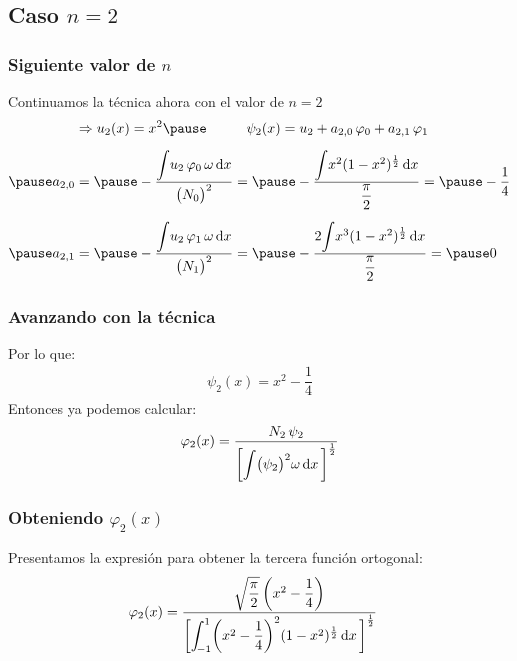 \documentclass[12pt]{beamer}
\begin{document}
\subsection{Caso \texorpdfstring{$n = 2$}{n = 2}}

\begin{frame}
\frametitle{Siguiente valor de $n$}
Continuamos la técnica ahora con el valor de $n = 2$
\pause
\begin{eqnarray*}
\begin{aligned}
&\Rightarrow u_{2} (x) = x^{2} \pause \hspace{1cm} \psi_{2}(x) =  u_{2} + a_{2,0} \, \varphi_{0} + a_{2,1} \, \varphi_{1} \\[0.5em] \pause
a_{2,0} &= \pause - \dfrac{\scaleint{5ex} u_{2} \, \varphi_{0} \, \omega \dd{x}}{\big( N_{0} \big)^{2}} = \pause - \dfrac{\scaleint{5ex} x^{2} (1 - x^{2})^{\frac{1}{2}} \dd{x}}{\dfrac{\pi}{2}} = \pause - \dfrac{1}{4} \\[0.5em] \pause
a_{2,1} &= \pause - \dfrac{\scaleint{5ex} u_{2} \, \varphi_{1} \, \omega \dd{x}}{\big( N_{1} \big)^{2}} = \pause
- \dfrac{2 \scaleint{5ex} x^{3} (1 - x^{2})^{\frac{1}{2}} \dd{x}}{\dfrac{\pi}{2}} = \pause 0
\end{aligned}
\end{eqnarray*}    
\end{frame}
\begin{frame}
\frametitle{Avanzando con la técnica}
Por lo que:
\pause
\begin{align*}
\psi_{2}(x) = x^{2} - \dfrac{1}{4}
\end{align*}
\pause
Entonces ya podemos calcular:
\pause
\begin{align*}
\varphi_{2}(x) = \dfrac{N_{2} \, \psi_{2}}{ \bigg[ \scaleint{5ex} \big( \psi_{2} \big)^{2} \omega \dd{x} \bigg]^{\frac{1}{2}}}
\end{align*}
\end{frame}
\begin{frame}
\frametitle{Obteniendo $\varphi_{2}(x)$}
Presentamos la expresión para obtener la tercera función ortogonal:
\pause
\begin{eqnarray*}
\begin{aligned}
\varphi_{2}(x) &= \dfrac{\sqrt{\dfrac{\pi}{2}} \, \bigg( x^{2} - \dfrac{1}{4} \bigg)}{ \bigg[ \scaleint{5ex}_{\bs -1}^{1} \bigg( x^{2} - \dfrac{1}{4} \bigg)^{2} (1 -x^{2})^{\frac{1}{2}} \dd{x} \bigg]^{\frac{1}{2}}}
\end{aligned}
\end{eqnarray*}
\end{frame}
\end{document}
